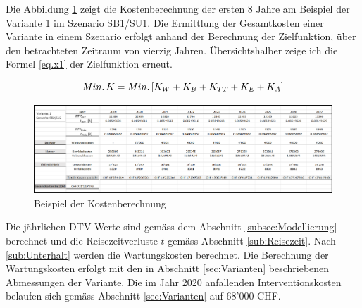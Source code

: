 %
%
%
%


Die Abbildung \ref{img:Kostenberechnung} zeigt die Kostenberechnung der ersten 8 Jahre am Beispiel der Variante 1 im Szenario SB1/SU1. 
Die Ermittlung der Gesamtkosten einer Variante in einem Szenario erfolgt anhand der Berechnung der Zielfunktion, über den betrachteten Zeitraum von vierzig Jahren. Übersichtshalber zeige ich die Formel \ref{eq.x1} der Zielfunktion erneut.

\begin{equation}
Min. \thinspace K = Min. \thinspace [K_{W} + K_{B} + K_{TT} + K_{E} + K_{A}]
\label{eq.x1}
\end{equation} 

\begin{figure}[h!]
	\centering
	\includegraphics[width=\textwidth]{figures/f-04-06-04-Kostenberechnung}
	\caption[Kostenberechnung]{Beispiel der Kostenberechnung}
	\label{img:Kostenberechnung}
\end{figure}

Die jährlichen DTV Werte sind gemäss dem Abschnitt \ref{subsec:Modellierung} berechnet und die Reisezeitverluste $t$ gemäss Abschnitt \ref{sub:Reisezeit}. Nach \ref{sub:Unterhalt} werden die Wartungskosten berechnet. Die Berechnung der Wartungskosten erfolgt mit den in Abschnitt \ref{sec:Varianten} beschriebenen Abmessungen der Variante. Die im Jahr 2020 anfallenden Interventionskosten belaufen sich gemäss Abschnitt \ref{sec:Varianten} auf 68'000 CHF.


